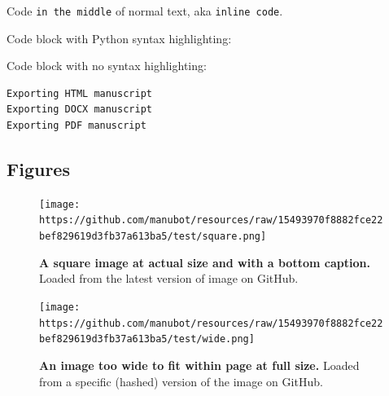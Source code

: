 Code \texttt{in\ the\ middle} of normal text, aka \texttt{inline\ code}.

Code block with Python syntax highlighting:

\begin{Shaded}
\begin{Highlighting}[]

\OperatorTok{=}\NormalTok{)}
    \OperatorTok{==} 
\end{Highlighting}
\end{Shaded}

Code block with no syntax highlighting:

\begin{verbatim}
Exporting HTML manuscript
Exporting DOCX manuscript
Exporting PDF manuscript
\end{verbatim}

\hypertarget{figures}{%
\subsection{Figures}\label{figures}}

\begin{figure}
\hypertarget{fig:square-image}{%
\centering
\texttt{[image: https://github.com/manubot/resources/raw/15493970f8882fce22bef829619d3fb37a613ba5/test/square.png]}
\caption{\textbf{A square image at actual size and with a bottom caption.}
Loaded from the latest version of image on GitHub.}\label{fig:square-image}
}
\end{figure}

\begin{figure}
\hypertarget{fig:wide-image}{%
\centering
\texttt{[image: https://github.com/manubot/resources/raw/15493970f8882fce22bef829619d3fb37a613ba5/test/wide.png]}
\caption{\textbf{An image too wide to fit within page at full size.}
Loaded from a specific (hashed) version of the image on GitHub.}\label{fig:wide-image}
}
\end{figure}

